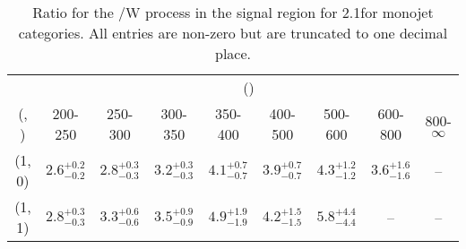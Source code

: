 \begin{table}[h!]
\tiny
\centering
\caption{Ratio for the \ttbar/W process in the signal region for 2.1\ifb for monojet categories. All entries are non-zero but are truncated to one decimal place.\label{tab:ratiosep_sig_ttw_mono}}
\begin{tabular}
{ccccccccc}
	\hline\hline
	& \multicolumn{8}{c}{\scalht (\gev)} \\ 
	 (\njet,  \nb) & 200-250 & 250-300 & 300-350 & 350-400 & 400-500 & 500-600 & 600-800 & 800-$\infty$ \\ [0.8ex] 
\hline
	(1, 0) & $2.6^{+ 0.2 }_{- 0.2 }$ & $2.8^{+ 0.3 }_{- 0.3 }$ & $3.2^{+ 0.3 }_{- 0.3 }$ & $4.1^{+ 0.7 }_{- 0.7 }$ & $3.9^{+ 0.7 }_{- 0.7 }$ & $4.3^{+ 1.2 }_{- 1.2 }$ & $3.6^{+ 1.6 }_{- 1.6 }$ & -- \\[0.5ex] 
	(1, 1) & $2.8^{+ 0.3 }_{- 0.3 }$ & $3.3^{+ 0.6 }_{- 0.6 }$ & $3.5^{+ 0.9 }_{- 0.9 }$ & $4.9^{+ 1.9 }_{- 1.9 }$ & $4.2^{+ 1.5 }_{- 1.5 }$ & $5.8^{+ 4.4 }_{- 4.4 }$ & -- & -- \\[0.5ex] 
	\hline
	\hline
\end{tabular}
\end{table}
